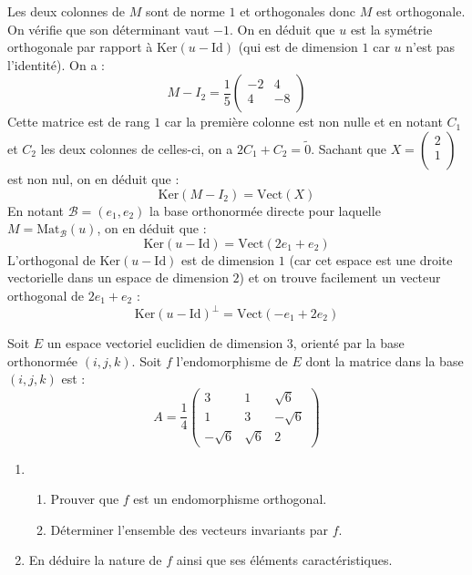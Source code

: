 \documentclass[a4paper,10pt]{report}
\begin{document}
\corr Les deux colonnes de $M$ sont de norme $1$ et orthogonales donc $M$ est orthogonale. On vérifie que son déterminant vaut $-1$. On en déduit que $u$ est la symétrie orthogonale par rapport à $\textrm{Ker}(u- \textrm{Id})$ (qui est de dimension $1$ car $u$ n'est pas l'identité). On a :
$$ M- I_2 = \dfrac{1}{5} \begin{pmatrix}
-2 & 4 \\
4 & -8 \\
\end{pmatrix}$$
Cette matrice est de rang $1$ car la première colonne est non nulle et en notant $C_1$ et $C_2$ les deux colonnes de celles-ci, on a $2C_1+C_2= \tilde{0}$. Sachant que $X=\begin{pmatrix}
2 \\
1 \\
\end{pmatrix}$ est non nul, on en déduit que :
$$ \textrm{Ker}(M-I_2) = \textrm{Vect}(X)$$
En notant $\mathcal{B}=(e_1,e_2)$ la base orthonormée directe pour laquelle $M= \textrm{Mat}_{\mathcal{B}}(u)$, on en déduit que :
$$ \textrm{Ker}(u- \textrm{Id}) = \textrm{Vect}(2e_1+e_2)$$
L'orthogonal de  $\textrm{Ker}(u- \textrm{Id})$ est de dimension $1$ (car cet espace est une droite vectorielle dans un espace de dimension $2$) et on trouve facilement un vecteur orthogonal de $2e_1+e_2$ :
$$  \textrm{Ker}(u- \textrm{Id})^{\perp} =  \textrm{Vect}(-e_1+2e_2)$$




\begin{Exercice}{} Soit $E$ un espace vectoriel euclidien de dimension 3, orienté par la base orthonormée $(i,j,k)$. Soit $f$ l'endomorphisme de $E$ dont la matrice dans la base $(i,j,k)$ est :
$$A=\dfrac{1}{4}\begin{pmatrix}
3&1&\sqrt{6}\\
1&3&-\sqrt{6}\\
-\sqrt{6}&\sqrt{6}&2
\end{pmatrix}$$
\begin{enumerate}
\item
\begin{enumerate}
\item 
Prouver que $f$ est un endomorphisme orthogonal.
\item
Déterminer l'ensemble des vecteurs invariants par $f$.
\end{enumerate}
\item
En déduire la nature de $f$ ainsi que ses éléments caractéristiques.
\end{enumerate}
\end{Exercice}
\end{document}

